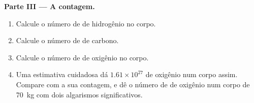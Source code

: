 \begin{problem}
\medskip
\noindent\textbf{Parte III --- A contagem.}
\begin{enumerate}[resume]
  \item Calcule o número de  de hidrogênio no corpo.
  \item Calcule o número de  de carbono.
  \item Calcule o número de  de oxigênio no corpo.
  \item Uma estimativa cuidadosa dá $1.61 \times 10^{27}$  de
        oxigênio num corpo assim. Compare com a sua contagem, e dê o
        número de  de oxigênio num corpo de \qty{70}{kg} com dois
        algarismos significativos.
\end{enumerate}
\end{problem}
